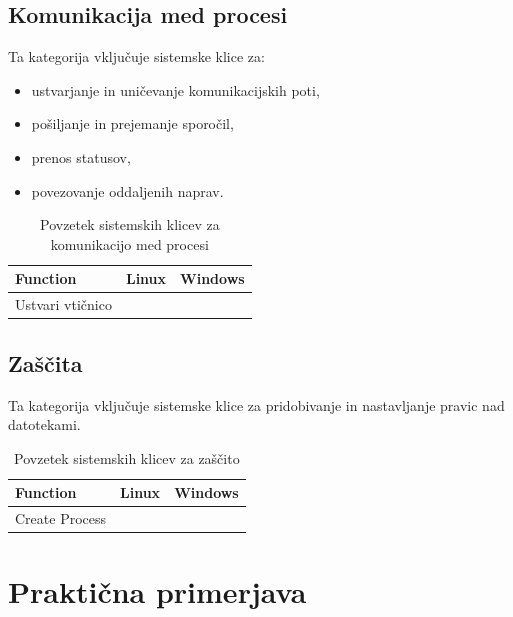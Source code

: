 \documentclass[a4paper,12pt,openright]{book}
\begin{document}
\section{Komunikacija med procesi}

Ta kategorija vključuje sistemske klice za:
\begin{itemize}
	\item ustvarjanje in uničevanje komunikacijskih poti,
	\item pošiljanje in prejemanje sporočil,
	\item prenos statusov,
	\item povezovanje oddaljenih naprav. \cite{Silberschatz_Galvin_Gagne_2018}
\end{itemize}

\begin{table}[h!]
	\begin{center}
		\begin{tabular}{ p{3.7cm}|p{2.5cm}|p{6cm} }
			Function          & Linux   & Windows \\
			\hline
			Ustvari vtičnico & \verb|| & \verb|| \\
		\end{tabular}
	\end{center}
	\label{tab:communications}
	\caption{Povzetek sistemskih klicev za komunikacijo med procesi}
\end{table}

\section{Zaščita}

Ta kategorija vključuje sistemske klice za pridobivanje in nastavljanje pravic nad datotekami. \cite{Silberschatz_Galvin_Gagne_2018}

\begin{table}[h!]
	\begin{center}
		\begin{tabular}{ p{3.7cm}|p{2.5cm}|p{6cm} }
			Function       & Linux   & Windows \\
			\hline
			Create Process & \verb|| & \verb|| \\
		\end{tabular}
	\end{center}
	\label{tab:protection}
	\caption{Povzetek sistemskih klicev za zaščito}
\end{table}

\chapter{Praktična primerjava}
\end{document}
